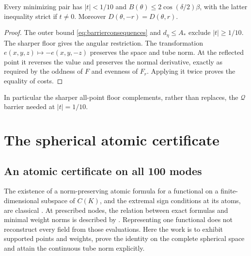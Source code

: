 \documentclass[11pt,a4paper]{article}
\begin{document}
\begin{corollary}\label{cor:location}
Every minimizing pair has $|t|<1/10$ and
$B(\theta)\le2\cos(\delta/2)\beta$, with the latter inequality
strict if $t\ne0$. Moreover $D(\theta,-r)=D(\theta,r)$.
\end{corollary}
\begin{proof}
The outer bound \eqref{eq:barrierconsequences} and $d_\eta\le A_*$
exclude $|t|\ge1/10$. The sharper floor gives the angular restriction.
The transformation $e(x,y,z)\mapsto-e(x,y,-z)$ preserves the space
and tube norm. At the reflected point it reverses the value and preserves
the normal derivative, exactly as required by the oddness of $F$ and
evenness of $F_r$. Applying it twice proves the equality of costs.
\end{proof}
In particular the sharper all-point floor complements, rather than
replaces, the $\mathcal Q$ barrier needed at $|t|=1/10$.

\section{The spherical atomic certificate}\label{sec:atomic}

\subsection{An atomic certificate on all 100 modes}\label{sec:lift}


The existence of a norm-preserving atomic formula for a functional
on a finite-dimensional subspace of $C(K)$, and the extremal sign
conditions at its atoms, are classical
\cite[Theorem 4.4, Corollary 4.5 and Proposition 4.7]{Dressler}.
At prescribed nodes, the relation between exact formulas and
minimal weight norms is described by
\cite[Section 3, Theorem 9]{DavydovSchaback}.
Representing one functional does not reconstruct every field
from those evaluations. Here the work is to exhibit supported
points and weights, prove the identity on the complete spherical
space and attain the continuous tube norm explicitly.
\end{document}
